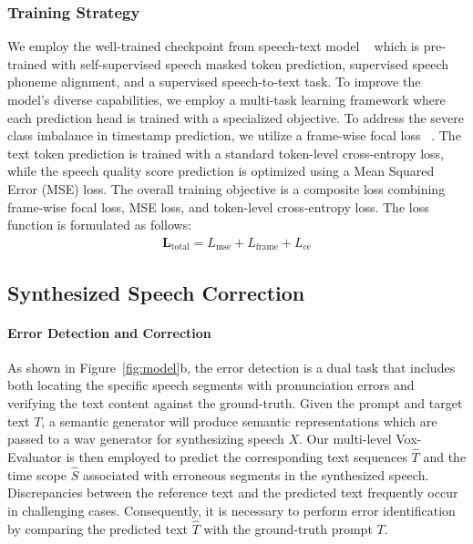 \documentclass[letterpaper]{article} %
\begin{document}
\subsubsection{Training Strategy}
We employ the well-trained checkpoint from speech-text model ~\cite{tang2022unified} which is pre-trained with self-supervised speech masked token prediction, supervised speech phoneme alignment, and a supervised speech-to-text task. 
To improve the model's diverse capabilities, we employ a multi-task learning framework where each prediction head is trained with a specialized objective. To address the severe class imbalance in timestamp prediction, we utilize a frame-wise focal loss ~\cite{lin2017focal}. The text token prediction is trained with a standard token-level cross-entropy loss, while the speech quality score prediction is optimized using a Mean Squared Error (MSE) loss.
The overall training objective is a composite loss combining frame-wise focal loss, MSE loss, and token-level cross-entropy loss. The loss function is formulated as follows:
\begin{align}
\mathbf{L}_{\text{total}} = L_{\text{mse}} + L_{\text{frame}} + L_{\text{ce}}
\end{align}

\subsection{Synthesized Speech Correction}
\paragraph{Error Detection and Correction}
As shown in Figure~\ref{fig:model}b, the error detection is a dual task that includes both locating the specific speech segments with pronunciation errors and verifying the text content against the ground-truth. Given the prompt and target text $T$, a semantic generator will produce semantic representations which are passed to a wav generator for synthesizing speech $X$. Our multi-level Vox-Evaluator is then employed to predict the corresponding text sequences $\hat{T}$ and the time scope $\hat{S}$ associated with erroneous segments in the synthesized speech. Discrepancies between the reference text and the predicted text frequently occur in challenging cases. Consequently, it is necessary to perform error identification by comparing the predicted text $\hat{T}$ with the ground-truth prompt $T$. 
\end{document}
